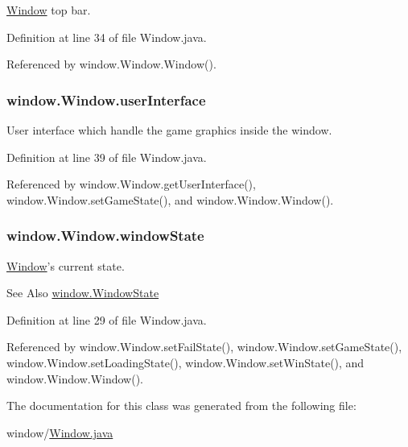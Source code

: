 \hyperlink{classwindow_1_1_window}{Window} top bar. 



Definition at line 34 of file Window.\-java.



Referenced by window.\-Window.\-Window().

\hypertarget{classwindow_1_1_window_a0021ebc966e051019f4f7c5e4984e77f}{
\subsubsection[{user\-Interface}]{ window.\-Window.\-user\-Interface\hspace{0.3cm}{\ttfamily [protected]}}}\label{classwindow_1_1_window_a0021ebc966e051019f4f7c5e4984e77f}


User interface which handle the game graphics inside the window. 



Definition at line 39 of file Window.\-java.



Referenced by window.\-Window.\-get\-User\-Interface(), window.\-Window.\-set\-Game\-State(), and window.\-Window.\-Window().

\hypertarget{classwindow_1_1_window_aaf636394a965f1a77233071375d4fe44}{
\subsubsection[{window\-State}]{ window.\-Window.\-window\-State\hspace{0.3cm}{\ttfamily [protected]}}}\label{classwindow_1_1_window_aaf636394a965f1a77233071375d4fe44}


\hyperlink{classwindow_1_1_window}{Window}'s current state. 

\begin{DoxySeeAlso}{See Also}
\hyperlink{enumwindow_1_1_window_state}{window.\-Window\-State} 
\end{DoxySeeAlso}


Definition at line 29 of file Window.\-java.



Referenced by window.\-Window.\-set\-Fail\-State(), window.\-Window.\-set\-Game\-State(), window.\-Window.\-set\-Loading\-State(), window.\-Window.\-set\-Win\-State(), and window.\-Window.\-Window().



The documentation for this class was generated from the following file\-:\begin{DoxyCompactItemize}
\item 
window/\hyperlink{_window_8java}{Window.\-java}\end{DoxyCompactItemize}
